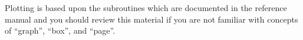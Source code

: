 
Plotting is based upon the  subroutines which are
documented in the \bmad reference manual and you should review this
material if you are not familiar with concepts of ``graph'', ``box'',
and ``page''. 

